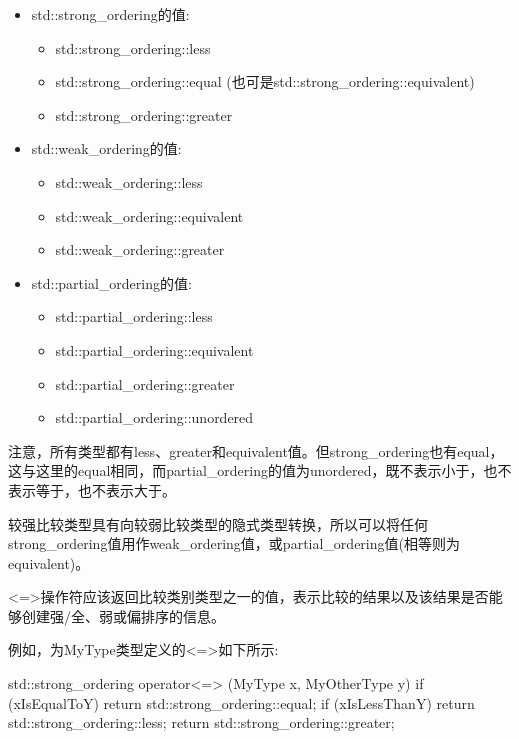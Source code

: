 \begin{itemize}
\item
std::strong\_ordering的值:
\begin{itemize}
\item
std::strong\_ordering::less

\item
std::strong\_ordering::equal (也可是std::strong\_ordering::equivalent)

\item
std::strong\_ordering::greater
\end{itemize}

\item
std::weak\_ordering的值:
\begin{itemize}
\item
std::weak\_ordering::less

\item
std::weak\_ordering::equivalent

\item
std::weak\_ordering::greater
\end{itemize}

\item
std::partial\_ordering的值:
\begin{itemize}
\item
std::partial\_ordering::less

\item
std::partial\_ordering::equivalent

\item
std::partial\_ordering::greater

\item
std::partial\_ordering::unordered
\end{itemize}
\end{itemize}

注意，所有类型都有less、greater和equivalent值。但strong\_ordering也有equal，这与这里的equal相同，而partial\_ordering的值为unordered，既不表示小于，也不表示等于，也不表示大于。

较强比较类型具有向较弱比较类型的隐式类型转换，所以可以将任何strong\_ordering值用作weak\_ordering值，或partial\_ordering值(相等则为equivalent)。


<=>操作符应该返回比较类别类型之一的值，表示比较的结果以及该结果是否能够创建强/全、弱或偏排序的信息。

例如，为MyType类型定义的<=>如下所示:

\begin{cpp}
std::strong_ordering operator<=> (MyType x, MyOtherType y)
{
	if (xIsEqualToY) return std::strong_ordering::equal;
	if (xIsLessThanY) return std::strong_ordering::less;
	return std::strong_ordering::greater;
}
\end{cpp}

